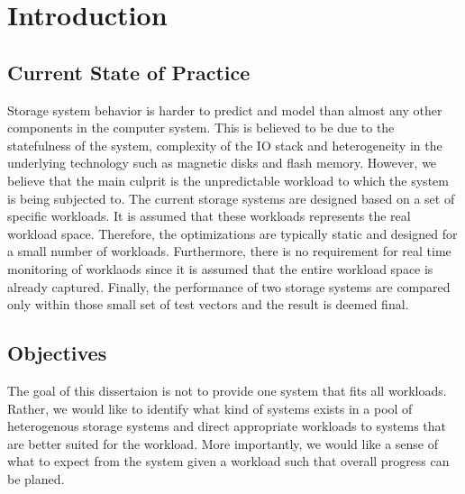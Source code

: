\chapter{Introduction}
\label{INTRO}


\section{Current State of Practice}
Storage system behavior is harder to predict and model than almost any other components in the computer system. 
This is believed to be due to the statefulness of the system, complexity of the IO stack and heterogeneity in the underlying technology such as magnetic disks and flash memory.
However, we believe that the main culprit is the unpredictable workload to which the system is being subjected to.
The current storage systems are designed based on a set of specific workloads. 
It is assumed that these workloads represents the real workload space.
Therefore, the optimizations are typically static and designed for a small number of workloads.
Furthermore, there is no requirement for real time monitoring of worklaods since it is assumed that the entire workload space is already captured. 
Finally, the performance of two storage systems are compared only within those small set of test vectors and the result is deemed final. 

\section{Objectives}
The goal of this dissertaion is not to provide one system that fits all workloads. 
Rather, we would like to identify what kind of systems exists in a pool of heterogenous storage systems and direct appropriate workloads to systems that are better suited for the workload.
More importantly, we would like a sense of what to expect from the system given a workload such that overall progress can be planed. 
 
